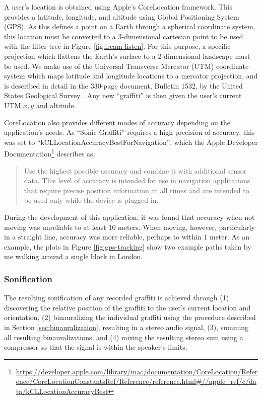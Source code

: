 \documentclass[a4paper,11pt,final]{ThesisStyle}
\begin{document}
A user's location is obtained using Apple's CoreLocation framework.  This provides a latitude, longitude, and altitude using Global Positioning System (GPS).  As this defines a point on a Earth through a spherical coordinate system, this location must be converted to a 3-dimensional cartesian point to be used with the filter tree in Figure \ref{fig:ircam-listen}.  For this purpose, a specific projection which flattens the Earth's surface to a 2-dimensional landscape must be used.  We make use of the Universal Transverse Mercator (UTM) coordinate system which maps latitude and longitude locations to a mercator projection, and is described in detail in the 330-page document, Bulletin 1532, by the United States Geological Survey \cite{}.  Any new ``graffiti'' is then given the user's current UTM $x,y$ and altitude.  

CoreLocation also provides different modes of accuracy depending on the application's needs.  As ``Sonic Graffiti'' requires a high precision of accuracy, this was set to ``kCLLocationAccuracyBestForNavigation'', which the Apple Developer Documentation\footnote{\url{https://developer.apple.com/library/mac/documentation/CoreLocation/Reference/CoreLocationConstantsRef/Reference/reference.html#//apple\_ref/c/data/kCLLocationAccuracyBest}} describes as:

\begin{quotation}
Use the highest possible accuracy and combine it with additional sensor data. This level of accuracy is intended for use in navigation applications that require precise position information at all times and are intended to be used only while the device is plugged in.
\end{quotation}

During the development of this application, it was found that accuracy when not moving was unreliable to at least 10 meters.  When moving, however, particularly in a straight line, accuracy was more reliable, perhaps to within 1 meter.  As an example, the plots in Figure \ref{fig:gps-tracking} show two example paths taken by me walking around a single block in London.  

\subsubsection{Sonification}

The resulting sonification of any recorded graffiti is achieved through (1) discovering the relative position of the graffiti to the user's current location and orientation, (2) binauralizing the individual graffiti using the procedure described in Section \ref{sec:binauralization}, resulting in a stereo audio signal, (3), summing all resulting binauralizations, and (4) mixing the resulting stereo sum using a compressor so that the signal is within the speaker's limits.   
\end{document}
